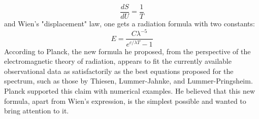 \documentclass[9pt,a4paper, twocolumn]{article}
\newcounter{theo}
\begin{document}
            \begin{equation}
                \frac{dS}{dU}=\frac1T
            \end{equation}
            and Wien's "displacement" law, one gets a radiation formula with two constants:
            \begin{equation}
                \boxed{
                    E = \frac{C\lambda^{-5}}{e^{c/\lambda T}-1}
                }
            \end{equation}
            According to Planck, the new formula he proposed, from the perspective of the electromagnetic theory of radiation, appears to fit the currently available observational data as satisfactorily as the best equations proposed for the spectrum, such as those by Thiesen, Lummer-Jahnke, and Lummer-Pringsheim. Planck supported this claim with numerical examples. He believed that this new formula, apart from Wien's expression, is the simplest possible and wanted to bring attention to it.
\end{document}
